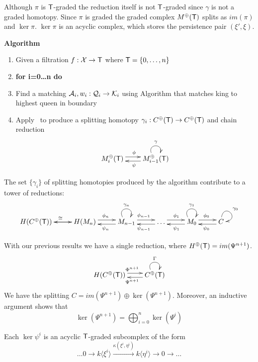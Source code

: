 Although $\pi$ is ${\mathsf T}$-graded the reduction itself is not ${\mathsf T}$-graded since $\gamma$ is not a graded homotopy.  Since $\pi$ is graded the graded complex $M^\oplus({\mathsf T})$ splits as $im(\pi)$ and $\ker \pi$.  $\ker \pi$ is an acyclic complex, which stores the persistence pair $(\xi',\xi)$.  
   

{\bf Algorithm}
\begin{enumerate}
\item Given a filtration $f:{\mathcal X}\to {\mathsf T}$ where ${\mathsf T} = \{0,\ldots, n\}$
\item {\bf for i=0\ldots n do}
\item Find a matching ${\mathcal A}_i,w_i:{\mathcal Q}_i\to {\mathcal K}_i$ using Algorithm that matches king to highest queen in boundary
\item Apply~\cite[Algorithm 3.12]{focm} to produce a splitting homotopy $\gamma_i:C^\oplus({\mathsf T})\to C^\oplus({\mathsf T})$ and chain reduction
\[
\xymatrixrowsep{0.03in}
\xymatrixcolsep{0.3in}
\xymatrix{
M_i^\oplus(\sT)  \ar[r]<3pt>^{\phi} & \ar[l]<3pt>^{\psi} M_{i-1}^\oplus(\sT) \ar@(ul,ur)^{\gamma}
}
\]
\end{enumerate}

The set $\{\gamma_i\}$ of splitting homotopies produced by the algorithm contribute to a tower of reductions:
\[
\xymatrixrowsep{0.03in}
\xymatrixcolsep{0.35in}
\xymatrix{
H(C^\oplus(\sT)) \ar[r]^{\cong} & \ar[l]  H(M_n) \ar[r]<3pt>^{\phi_n} & \ar[l]<3pt>^{\psi_n } M_{n-1} \ar@(ul,ur)^{\gamma_n} \ar[r]<3pt>^{\phi_{n-1}} & \ar[l]<3pt>^{\psi_{n-1}}  \ldots \ar[r]<3pt>^{\phi_1}  & \ar[l]<3pt>^{\psi_1 }M_0 \ar@(ul,ur)^{\gamma_1}  \ar[r]<3pt>^{\phi_0} & \ar[l]<3pt>^{\psi_0} C \ar@(u,r)^{\gamma_0}
}
\]

With our previous results we have a single reduction, where $H^\oplus({\mathsf T}) = im(\Psi^{n+1})$.
 \[
\xymatrixrowsep{0.03in}
\xymatrixcolsep{0.3in}
\xymatrix{
H(C^\oplus(\sT)) \ar[r]<3pt>^{\Phi^{n+1}}   & \ar[l]<3pt>^{\Psi^{n+1}} C^\oplus(\sT) \ar@(ul,ur)^{\Gamma} 
}
\]
We have the splitting $C = im(\Psi^{n+1})\oplus \ker(\Psi^{n+1})$.  Moreover, an inductive argument shows that 
\[
\ker(\Psi^{n+1}) = \bigoplus_{i=0}^n \ker (\Psi^i)
\]

Each $\ker\psi^i$ is an acyclic ${\mathsf T}$-graded subcomplex of the form 
\[
\ldots 0 \to k\langle \xi^i\rangle \xrightarrow{ \kappa (\xi^i,\eta^i)} k\langle \eta^i\rangle \to 0\to \ldots
\]


